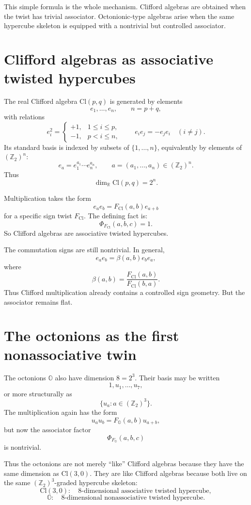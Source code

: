 \documentclass[11pt]{article}
\newcommand{\Ztwo}{\mathbb Z_2}
\newcommand{\R}{\mathbb R}
\newcommand{\Cl}{\mathrm{Cl}}
\newcommand{\OO}{\mathbb O}
\newcommand{\assoc}{\Phi}
\begin{document}
This simple formula is the whole mechanism. Clifford algebras are obtained
when the twist has trivial associator. Octonionic-type algebras arise when
the same hypercube skeleton is equipped with a nontrivial but controlled
associator.

\section{Clifford algebras as associative twisted hypercubes}

The real Clifford algebra $\Cl(p,q)$ is generated by elements
\[
e_1,\dots,e_n,\qquad n=p+q,
\]
with relations
\[
e_i^2 =
\begin{cases}
+1, & 1\leq i\leq p,\\
-1, & p<i\leq n,
\end{cases}
\qquad
e_i e_j = - e_j e_i
\quad (i\neq j).
\]
Its standard basis is indexed by subsets of $\{1,\dots,n\}$, equivalently by
elements of $(\Ztwo)^n$:
\[
e_a = e_1^{a_1}\cdots e_n^{a_n},
\qquad
a=(a_1,\dots,a_n)\in(\Ztwo)^n.
\]
Thus
\[
\dim_\R \Cl(p,q)=2^n.
\]

Multiplication takes the form
\[
e_a e_b = F_{\Cl}(a,b)e_{a+b}
\]
for a specific sign twist $F_{\Cl}$. The defining fact is:
\[
\assoc_{F_{\Cl}}(a,b,c)=1.
\]
So Clifford algebras are associative twisted hypercubes.

The commutation signs are still nontrivial. In general,
\[
e_a e_b
=
\beta(a,b) e_b e_a,
\]
where
\[
\beta(a,b)
=
\frac{F_{\Cl}(a,b)}{F_{\Cl}(b,a)}.
\]
Thus Clifford multiplication already contains a controlled sign geometry.
But the associator remains flat.

\section{The octonions as the first nonassociative twin}

The octonions $\OO$ also have dimension $8=2^3$. Their basis may be written
\[
1,u_1,\dots,u_7,
\]
or more structurally as
\[
\{u_a:a\in(\Ztwo)^3\}.
\]
The multiplication again has the form
\[
u_a u_b = F_{\OO}(a,b)u_{a+b},
\]
but now the associator factor
\[
\assoc_{F_{\OO}}(a,b,c)
\]
is nontrivial.

Thus the octonions are not merely ``like'' Clifford algebras because they
have the same dimension as $\Cl(3,0)$. They are like Clifford algebras
because both live on the same $(\Ztwo)^3$-graded hypercube skeleton:
\[
\Cl(3,0): \quad 8\text{-dimensional associative twisted hypercube},
\]
\[
\OO: \quad 8\text{-dimensional nonassociative twisted hypercube}.
\]
\end{document}
